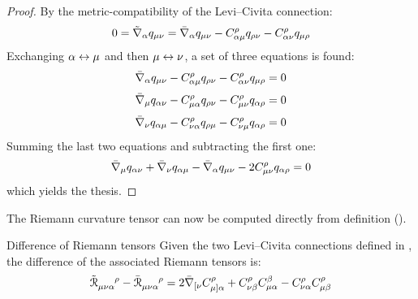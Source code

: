 \begin{proofbox}
  \begin{proof}
    By the metric-compatibility of the Levi--Civita connection:
    \begin{equation*}
      0 = \tilde{\nabla}_\alpha q_{\mu \nu} = \bar{\nabla}_\alpha q_{\mu \nu} - C^\rho_{\alpha \mu} q_{\rho \nu} - C^\rho_{\alpha \nu} q_{\mu \rho}
    \end{equation*}
    Exchanging $ \alpha \leftrightarrow \mu $ and then $ \mu \leftrightarrow \nu $, a set of three equations is found:
    \begin{equation*}
      \bar{\nabla}_\alpha q_{\mu \nu} - C^\rho_{\alpha \mu} q_{\rho \nu} - C^\rho_{\alpha \nu} q_{\mu \rho} = 0
    \end{equation*}
    \begin{equation*}
      \bar{\nabla}_\mu q_{\alpha \nu} - C^\rho_{\mu \alpha} q_{\rho \nu} - C^\rho_{\mu \nu} q_{\alpha \rho} = 0
    \end{equation*}
    \begin{equation*}
      \bar{\nabla}_\nu q_{\alpha \mu} - C^\rho_{\nu \alpha} q_{\rho \mu} - C^\rho_{\nu \mu} q_{\alpha \rho} = 0
    \end{equation*}
    Summing the last two equations and subtracting the first one:
    \begin{equation*}
      \bar{\nabla}_\mu q_{\alpha \nu} + \bar{\nabla}_\nu q_{\alpha \mu} - \bar{\nabla}_\alpha q_{\mu \nu} - 2 C^\rho_{\mu \nu} q_{\alpha \rho} = 0
    \end{equation*}
    which yields the thesis.
  \end{proof}
\end{proofbox}

The Riemann curvature tensor can now be computed directly from definition ().

\begin{lemma}{Difference of Riemann tensors}{}
  Given the two Levi--Civita connections defined in , the difference of the associated Riemann tensors is:
  \begin{equation}
    \tensor{\tilde{\rr}}{_{\mu \nu \alpha}^\rho} - \tensor{\bar{\rr}}{_{\mu \nu \alpha}^\rho} = 2 \bar{\na}_{[\nu} C^\rho_{\mu]\alpha} + C^\rho_{\nu \beta} C^\beta_{\mu \alpha} - C^\rho_{\nu \alpha} C^\rho_{\mu \beta}
    \label{eq:perturbation-riemann}
  \end{equation}
\end{lemma}

